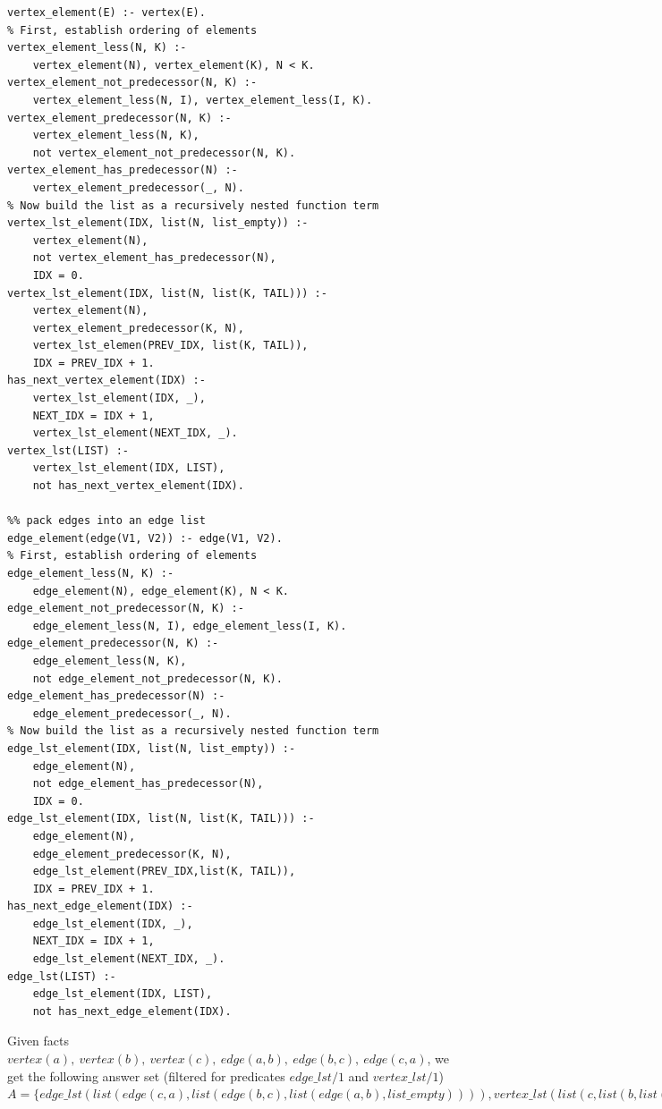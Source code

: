 \begin{lstlisting}[style=asp-code, label={lst:graph-list-aggregation}, caption={ASP code to create vertex and edge lists for a given graph.}]
%% pack vertices into a vertex list
vertex_element(E) :- vertex(E).
% First, establish ordering of elements
vertex_element_less(N, K) :- 
    vertex_element(N), vertex_element(K), N < K.
vertex_element_not_predecessor(N, K) :- 
    vertex_element_less(N, I), vertex_element_less(I, K).
vertex_element_predecessor(N, K) :- 
    vertex_element_less(N, K), 
    not vertex_element_not_predecessor(N, K).
vertex_element_has_predecessor(N) :- 
    vertex_element_predecessor(_, N).
% Now build the list as a recursively nested function term
vertex_lst_element(IDX, list(N, list_empty)) :- 
    vertex_element(N), 
    not vertex_element_has_predecessor(N), 
    IDX = 0.
vertex_lst_element(IDX, list(N, list(K, TAIL))) :- 
    vertex_element(N), 
    vertex_element_predecessor(K, N), 
    vertex_lst_elemen(PREV_IDX, list(K, TAIL)), 
    IDX = PREV_IDX + 1.
has_next_vertex_element(IDX) :- 
    vertex_lst_element(IDX, _), 
    NEXT_IDX = IDX + 1, 
    vertex_lst_element(NEXT_IDX, _).
vertex_lst(LIST) :- 
    vertex_lst_element(IDX, LIST), 
    not has_next_vertex_element(IDX).

%% pack edges into an edge list
edge_element(edge(V1, V2)) :- edge(V1, V2).
% First, establish ordering of elements
edge_element_less(N, K) :- 
    edge_element(N), edge_element(K), N < K.
edge_element_not_predecessor(N, K) :- 
    edge_element_less(N, I), edge_element_less(I, K).
edge_element_predecessor(N, K) :- 
    edge_element_less(N, K), 
    not edge_element_not_predecessor(N, K).
edge_element_has_predecessor(N) :- 
    edge_element_predecessor(_, N).
% Now build the list as a recursively nested function term
edge_lst_element(IDX, list(N, list_empty)) :- 
    edge_element(N), 
    not edge_element_has_predecessor(N), 
    IDX = 0.
edge_lst_element(IDX, list(N, list(K, TAIL))) :- 
    edge_element(N), 
    edge_element_predecessor(K, N), 
    edge_lst_element(PREV_IDX,list(K, TAIL)), 
    IDX = PREV_IDX + 1.
has_next_edge_element(IDX) :- 
    edge_lst_element(IDX, _), 
    NEXT_IDX = IDX + 1, 
    edge_lst_element(NEXT_IDX, _).
edge_lst(LIST) :- 
    edge_lst_element(IDX, LIST), 
    not has_next_edge_element(IDX).
\end{lstlisting} 
Given facts $vertex(a),~vertex(b),~vertex(c),~edge(a,b),~edge(b,c),~edge(c,a)$, we get the following answer set (filtered for predicates $edge\_lst/1$ and $vertex\_lst/1$) $A = \{edge\_lst(list(edge(c,a), list(edge(b,c), list(edge(a,b), list\_empty)))), vertex\_lst(list(c, list(b,list(a,list\_empty))))\}$

